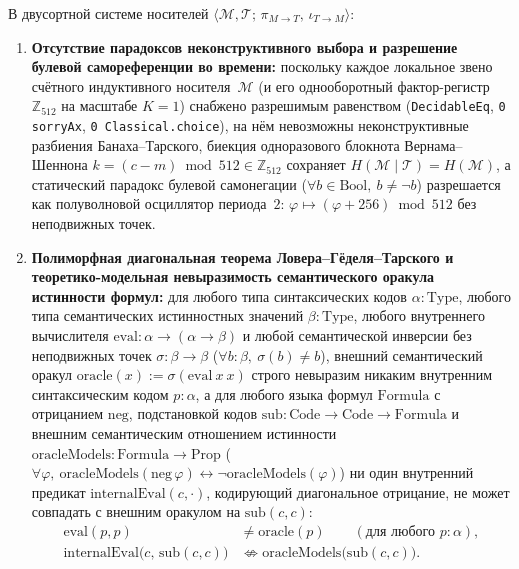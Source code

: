 \begin{theorem}
\label{thm:mono-godel-tarski}
В двусортной системе носителей $\langle\mathcal{M},\mathcal{T};\,\pi_{M\to T},\,\iota_{T\to M}\rangle$:
\begin{enumerate}[label=\textbf{(\arabic*)},leftmargin=*]
\item \textbf{Отсутствие парадоксов неконструктивного выбора и разрешение булевой самореференции во времени:}
  поскольку каждое локальное звено счётного индуктивного носителя~$\mathcal{M}$ (и его однооборотный фактор-регистр $\mathbb{Z}_{512}$ на масштабе $K=1$) снабжено разрешимым равенством (\texttt{DecidableEq}, \texttt{0 sorryAx}, \texttt{0 Classical.choice}), на нём невозможны неконструктивные разбиения Банаха--Тарского, биекция одноразового блокнота Вернама--Шеннона $k = (c - m)\bmod 512 \in \mathbb{Z}_{512}$ сохраняет $H(\mathcal{M}\mid\mathcal{T}) = H(\mathcal{M})$, а статический парадокс булевой самонегации ($\forall b\in\mathrm{Bool},\ b \ne \neg b$) разрешается как полуволновой осциллятор периода~$2$: $\varphi \mapsto (\varphi + 256)\bmod 512$ без неподвижных точек.
\item \textbf{Полиморфная диагональная теорема Ловера--Гёделя--Тарского и теоретико-модельная невыразимость семантического оракула истинности формул:}
  для любого типа синтаксических кодов $\alpha : \mathrm{Type}$, любого типа семантических истинностных значений $\beta : \mathrm{Type}$, любого внутреннего вычислителя $\mathrm{eval} : \alpha \to (\alpha \to \beta)$ и любой семантической инверсии без неподвижных точек $\sigma : \beta \to \beta$ ($\forall b:\beta,\ \sigma(b) \ne b$), внешний семантический оракул $\mathrm{oracle}(x) := \sigma(\mathrm{eval}\ x\ x)$ строго невыразим никаким внутренним синтаксическим кодом $p : \alpha$, а для любого языка формул $\mathrm{Formula}$ с отрицанием $\mathrm{neg}$, подстановкой кодов $\mathrm{sub} : \mathrm{Code}\to\mathrm{Code}\to\mathrm{Formula}$ и внешним семантическим отношением истинности $\mathrm{oracleModels} : \mathrm{Formula}\to\mathrm{Prop}$ ($\forall\varphi,\ \mathrm{oracleModels}(\mathrm{neg}\,\varphi)\leftrightarrow\neg\mathrm{oracleModels}(\varphi)$) ни один внутренний предикат $\mathrm{internalEval}(c,\cdot)$, кодирующий диагональное отрицание, не может совпадать с внешним оракулом на $\mathrm{sub}(c,c)$:
  \begin{align}
    \mathrm{eval}(p, p) &\ne \mathrm{oracle}(p) \qquad (\text{для любого } p : \alpha), \label{eq:mono-lawvere-godel-tarski} \\
    \mathrm{internalEval}\bigl(c,\, \mathrm{sub}(c, c)\bigr) &\not\Longleftrightarrow \mathrm{oracleModels}\bigl(\mathrm{sub}(c, c)\bigr). \label{eq:mono-tarski-undefinability}
  \end{align}
\end{enumerate}
\end{theorem}

